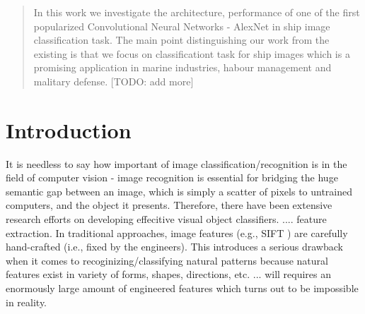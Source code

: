 \documentclass{sig-alternate}
\begin{document}
\maketitle
\begin{abstract}
In this work we investigate the architecture, performance of one of the first popularized Convolutional Neural Networks - AlexNet in ship image classification task. The main point distinguishing our work from the existing is that we focus on classificationt task for ship images which is a promising application in marine industries, habour management and malitary defense. [TODO: add more]
\end{abstract}




\section{Introduction}
It is needless to say how important of image classification/recognition is in the field of computer vision - image recognition is essential for bridging the huge semantic gap between an image, which is simply a scatter of pixels to untrained computers, and the object it presents. Therefore, there have been extensive research efforts on developing effecitive visual object classifiers. .... feature extraction. In traditional approaches, image features (e.g., SIFT \citep{Lowe:2004:DIF:993451.996342}) are carefully hand-crafted (i.e., fixed by the engineers). This introduces a serious drawback when it comes to recoginizing/classifying natural patterns because natural features exist in variety of forms, shapes, directions, etc. ... will requires an enormously large amount of engineered features which turns out to be impossible in reality. 
\end{document}
